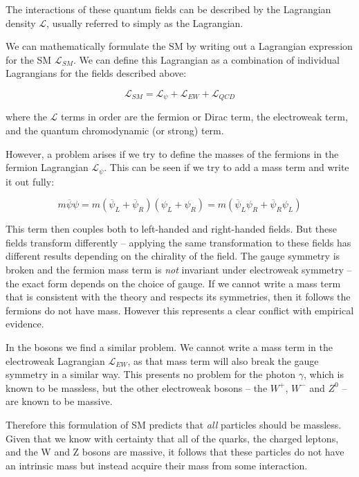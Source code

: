 The interactions of these quantum fields can be described by the Lagrangian density $\mathcal{L}$, usually referred to simply as the Lagrangian.

We can mathematically formulate the \acrlong{SM} by writing out a Lagrangian expression for the \acrlong{SM} $\mathcal{L}_{SM}$. We can define this Lagrangian as a combination of individual Lagrangians for the fields described above:

\begin{equation}
	\mathcal{L}_{SM} = \mathcal{L}_{\psi} + \mathcal{L}_{EW} + \mathcal{L}_{QCD}
\label{eq:sm-lagrangian-1}
\end{equation}

where the $\mathcal{L}$ terms in order are the fermion or Dirac term, the electroweak term, and the quantum chromodynamic (or strong) term.  %

However, a problem arises if we try to define the masses of the fermions in the fermion Lagrangian $\mathcal{L}_{\psi}$. This can be seen if we try to add a mass term and write it out fully:

\begin{equation}
	m \overline{\psi} \psi = m(\overline{\psi}_L + \overline{\psi}_R)(\psi_L + \psi_R) = m(\overline{\psi}_L \psi_R + \overline{\psi}_R \psi_L)
\label{eq:fermion-mass}
\end{equation}

This term then couples both to left-handed and right-handed fields. But these fields transform differently -- applying the same transformation to these fields has different results depending on the chirality of the field. The gauge symmetry is broken and the fermion mass term is \textit{not} invariant under electroweak symmetry -- the exact form depends on the choice of gauge. If we cannot write a mass term that is consistent with the theory and respects its symmetries, then it follows the fermions do not have mass. However this represents a clear conflict with empirical evidence. 

In the bosons we find a similar problem. We cannot write a mass term in the electroweak Lagrangian $\mathcal{L}_{EW}$, as that mass term will also break the gauge symmetry in a similar way. This presents no problem for the photon $\gamma$, which is known to be massless, but the other electroweak bosons -- the $W^+$, $W^-$ and $Z^0$ -- are known to be massive.

Therefore this formulation of \acrshort{SM} predicts that \textit{all} particles should be massless. Given that we know with certainty that all of the quarks, the charged leptons, and the W and Z bosons are massive, it follows that these particles do not have an intrinsic mass but instead acquire their mass from some interaction.

